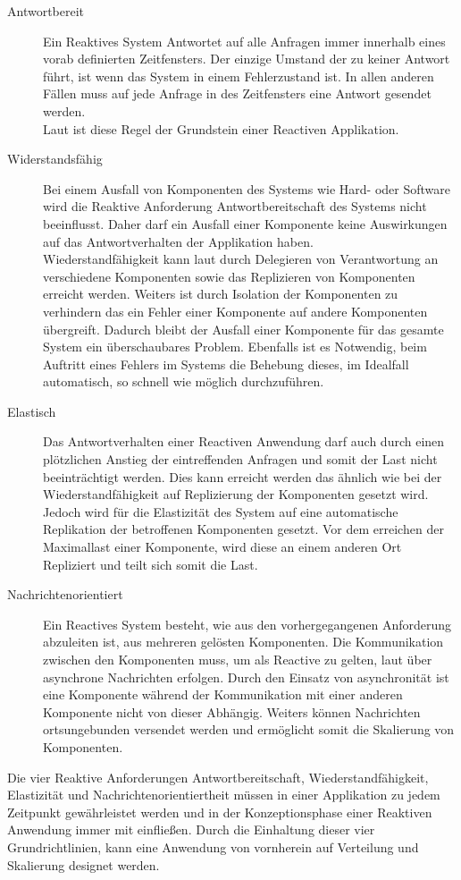 \begin{description}
    \item[Antwortbereit]\label{reactivo:responsive}
    Ein Reaktives System Antwortet auf alle Anfragen immer innerhalb eines vorab definierten Zeitfensters. Der einzige Umstand der zu keiner Antwort führt, ist wenn das System in einem Fehlerzustand ist. In allen anderen Fällen muss auf jede Anfrage in des Zeitfensters eine Antwort gesendet werden.\\
    Laut \cite{reactiveManifesto} ist diese Regel der Grundstein einer {Reactiven} Applikation.
    \item[Widerstandsfähig]\label{reactivo:resilient}
    Bei einem Ausfall von Komponenten des Systems wie Hard- oder Software wird die Reaktive Anforderung {Antwortbereitschaft} des Systems nicht beeinflusst. Daher darf ein Ausfall einer Komponente keine Auswirkungen auf das Antwortverhalten der Applikation haben.\\
    Wiederstandfähigkeit kann laut \cite{reactiveManifesto} durch Delegieren von Verantwortung an verschiedene Komponenten sowie das Replizieren von Komponenten erreicht werden. Weiters ist durch Isolation der Komponenten zu verhindern das ein Fehler einer Komponente auf andere Komponenten übergreift. Dadurch bleibt der Ausfall einer Komponente für das gesamte System ein überschaubares Problem. Ebenfalls ist es Notwendig, beim Auftritt eines Fehlers im Systems die Behebung dieses, im Idealfall automatisch, so schnell wie möglich durchzuführen.
    \item[Elastisch]\label{reactivo:elastic}
    Das Antwortverhalten einer Reactiven Anwendung darf auch durch einen plötzlichen Anstieg der eintreffenden Anfragen und somit der Last nicht beeinträchtigt werden. Dies kann erreicht werden das ähnlich wie bei der Wiederstandfähigkeit auf Replizierung der Komponenten gesetzt wird. Jedoch wird für die Elastizität des System auf eine automatische Replikation der betroffenen Komponenten gesetzt. Vor dem erreichen der Maximallast einer Komponente, wird diese an einem anderen Ort Repliziert und teilt sich somit die Last. 
    \item[Nachrichtenorientiert]\label{reactivo:messageDriven}
    Ein Reactives System besteht, wie aus den vorhergegangenen Anforderung abzuleiten ist, aus mehreren gelösten Komponenten. Die Kommunikation zwischen den Komponenten muss, um als Reactive zu gelten, laut \cite{reactiveManifesto}  über asynchrone Nachrichten erfolgen. Durch den Einsatz von asynchronität ist eine Komponente während der Kommunikation mit einer anderen Komponente nicht von dieser Abhängig. Weiters können Nachrichten ortsungebunden versendet werden und ermöglicht somit die Skalierung von Komponenten. 
\end{description} 
Die vier {Reaktive} Anforderungen Antwortbereitschaft, Wiederstandfähigkeit, Elastizität und Nachrichtenorientiertheit müssen in einer Applikation zu jedem Zeitpunkt gewährleistet werden und in der Konzeptionsphase einer Reaktiven Anwendung immer mit einfließen. Durch die Einhaltung dieser vier Grundrichtlinien, kann eine Anwendung von vornherein auf Verteilung und Skalierung designet werden.

